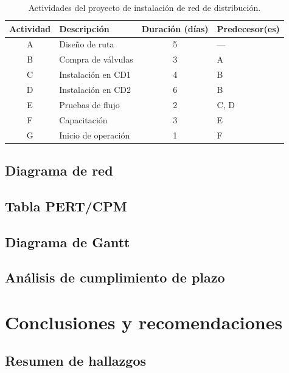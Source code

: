 \documentclass[12pt,a4paper]{article}
\begin{document}
\begin{table}[H]
  \centering
  \begin{tabular}{|c|l|c|l|}
    \hline
    \textbf{Actividad} & \textbf{Descripci\'{o}n} & \textbf{Duraci\'{o}n (d\'{i}as)} & \textbf{Predecesor(es)} \\
    \hline
    A & Dise\~{n}o de ruta       & 5 & --- \\
    B & Compra de v\'{a}lvulas   & 3 & A \\
    C & Instalaci\'{o}n en CD1   & 4 & B \\
    D & Instalaci\'{o}n en CD2   & 6 & B \\
    E & Pruebas de flujo          & 2 & C, D \\
    F & Capacitaci\'{o}n         & 3 & E \\
    G & Inicio de operaci\'{o}n  & 1 & F \\
    \hline
  \end{tabular}
  \caption{Actividades del proyecto de instalaci\'{o}n de red de distribuci\'{o}n.}
\end{table}

\subsection{Diagrama de red}

\subsection{Tabla PERT/CPM}


\subsection{Diagrama de Gantt}


\subsection{An\'{a}lisis de cumplimiento de plazo}


\section{Conclusiones y recomendaciones}

\subsection{Resumen de hallazgos}
\end{document}
